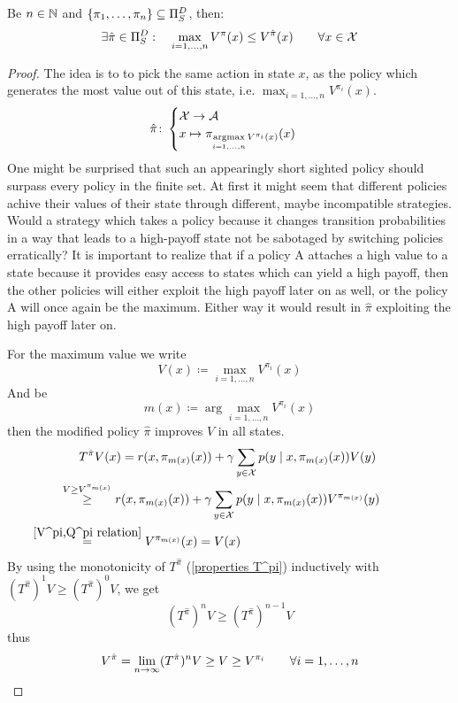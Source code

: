 \begin{prop}\label{finite outmatching}
	Be \(n\in\mathbb{N}\) and \(\{\pi_1,\dots,\pi_n\}\subseteq \Pi_S^D \), then:
	\[\exists \hat{\pi}\in\Pi_S^D: \quad \max_{i=1,\dots,n} V^\pi(x)\le V^{\hat{\pi}}(x) \qquad \forall x\in\mathcal{X} \]
\end{prop}
\begin{proof}
	The idea is to to pick the same action in state \(x\), as the policy which generates the most value out of this state, i.e. \(\max_{i=1,\dots,n}V^{\pi_i}(x)\). 
	\[
		\hat{\pi}\colon
	\begin{cases} 
		\mathcal{X}\to\mathcal{A}\\
		x\mapsto \pi_{\mathop{\text{argmax}}\limits_{i=1,\dots,n}V^{\pi_i}(x)}(x)
	\end{cases}
	\]
	One might be surprised that such an appearingly short sighted policy should surpass every policy in the finite set. At first it might seem that different policies achive their values of their state through different, maybe incompatible strategies. Would a strategy which takes a policy because it changes transition probabilities in a way that leads to a high-payoff state not be sabotaged by switching policies erratically?
	It is important to realize that if a policy A attaches a high value to a state because it provides easy access to states which can yield a high payoff, then the other policies will either exploit the high payoff later on as well, or the policy A will once again be the maximum. Either way it would result in \(\hat{\pi}\) exploiting the high payoff later on. 

	For the maximum value we write
	\[
		V(x)\coloneqq \max_{i=1,\dots, n}V^{\pi_i}(x)
	\]
	And be 
	\[
		m(x) \coloneqq \arg\max_{i=1,\dots,n}V^{\pi_i}(x)
	\]
	then the modified policy \(\hat{\pi}\) improves \(V\) in all states.
	\begin{align*}
		&T^{\hat{\pi}}V(x)=r(x,\pi_{m(x)}(x))
		+\gamma \sum_{y\in\cX} p(y\mid x,\pi_{m(x)}(x))V(y)\\
		&\lxgq{V\ge V^{\pi_{m(x)}}} r(x,\pi_{m(x)}(x))
		+\gamma \sum_{y\in\cX} p(y\mid x,\pi_{m(x)}(x))V^{\pi_{m(x)}}(y)\\
		&\lxeq{\ref{V^pi,Q^pi relation}} V^{\pi_{m(x)}}(x)=V(x)
	\end{align*}
	By using the monotonicity of \(T^{\hat{\pi}} \) (\ref{properties T^pi}) inductively with \((T^{\hat{\pi}})^1 V \ge (T^{\hat{\pi}})^0 V \), we get
	\[ 
		(T^{\hat{\pi}})^n V \ge (T^{\hat{\pi}})^{n-1} V 
	\]
	thus
	\[
		V^{\hat{\pi}} = \lim_{n\to\infty} (T^{\hat{\pi}})^n V 
		\ge V \ge V^{\pi_i}
		\qquad \forall i=1,\dots,n
		\qedhere
	\] 
\end{proof}

